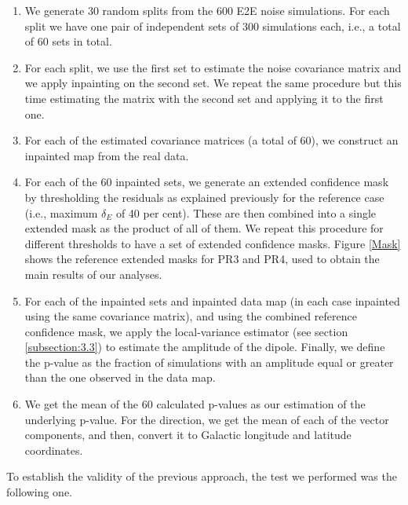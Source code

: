 \begin{enumerate}
    \item We generate 30 random splits from the 600 E2E noise simulations. For each split we have one pair of independent sets of 300 simulations each, i.e., a total of 60 sets in total.
    \item For each split, we use the first set
    to estimate the noise covariance matrix and we apply inpainting on the second set.
    We repeat the same procedure but this time estimating the matrix with the second set and applying it to the first one.
    \item For each of the estimated covariance matrices (a total of 60), we construct an inpainted map from the real data.
    \item For each of the 60 inpainted sets, we generate an extended confidence mask by thresholding the residuals as explained previously for the reference case (i.e., maximum $\delta_E$ of 40 per cent). These are then combined into a single extended mask as the product of all of them. We repeat this procedure for different thresholds to have a set of extended confidence masks. Figure \ref{Mask} shows the reference extended masks for PR3 and PR4, used to obtain the main results of our analyses. 
    \item For each of the inpainted sets and inpainted data map (in each case inpainted using the same covariance matrix), and using the combined reference confidence mask, we apply the local-variance estimator (see section \ref{subsection:3.3}) to estimate the amplitude of the dipole. Finally, we define the p-value as the fraction of simulations with an amplitude equal or greater than the one observed in the data map.
    \item We get the mean of the 60 calculated p-values as our estimation of the underlying p-value. For the direction, we get the mean of 
    each of the vector components, and then, convert it to Galactic longitude and latitude coordinates.
\end{enumerate}

To establish the validity of the previous approach, the test we performed was the following one. 

